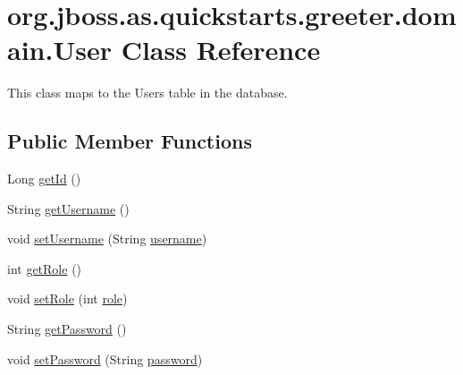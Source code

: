 \hypertarget{classorg_1_1jboss_1_1as_1_1quickstarts_1_1greeter_1_1domain_1_1_user}{}\section{org.\+jboss.\+as.\+quickstarts.\+greeter.\+domain.\+User Class Reference}
\label{classorg_1_1jboss_1_1as_1_1quickstarts_1_1greeter_1_1domain_1_1_user}


This class maps to the Users table in the database.  


\subsection*{Public Member Functions}
\begin{DoxyCompactItemize}
\item 
Long \hyperlink{classorg_1_1jboss_1_1as_1_1quickstarts_1_1greeter_1_1domain_1_1_user_a62025155c5f3ce35d3892b757b04d8bd}{get\+Id} ()
\item 
String \hyperlink{classorg_1_1jboss_1_1as_1_1quickstarts_1_1greeter_1_1domain_1_1_user_acdf5aa9d6873f0796d2710b8f299bbbe}{get\+Username} ()
\item 
void \hyperlink{classorg_1_1jboss_1_1as_1_1quickstarts_1_1greeter_1_1domain_1_1_user_adbbad5434f22ff7090f9135605bb5304}{set\+Username} (String \hyperlink{classorg_1_1jboss_1_1as_1_1quickstarts_1_1greeter_1_1domain_1_1_user_a111bb41fcb9076cd724197685892ca16}{username})
\item 
int \hyperlink{classorg_1_1jboss_1_1as_1_1quickstarts_1_1greeter_1_1domain_1_1_user_a44b912f042f4455b155c72d338a19747}{get\+Role} ()
\item 
void \hyperlink{classorg_1_1jboss_1_1as_1_1quickstarts_1_1greeter_1_1domain_1_1_user_aeb6d9d9ee4bfd351a599b607be58d91b}{set\+Role} (int \hyperlink{classorg_1_1jboss_1_1as_1_1quickstarts_1_1greeter_1_1domain_1_1_user_aaa5b8e23cb8bde33d19e9fbf0f15009d}{role})
\item 
String \hyperlink{classorg_1_1jboss_1_1as_1_1quickstarts_1_1greeter_1_1domain_1_1_user_a53ddd046de32fb9bc41d640a508ea06d}{get\+Password} ()
\item 
void \hyperlink{classorg_1_1jboss_1_1as_1_1quickstarts_1_1greeter_1_1domain_1_1_user_afce559d24a08d9583f2a178217d7f8b6}{set\+Password} (String \hyperlink{classorg_1_1jboss_1_1as_1_1quickstarts_1_1greeter_1_1domain_1_1_user_abd620665b4d038df44c8209ed851a99a}{password})
\end{DoxyCompactItemize}
